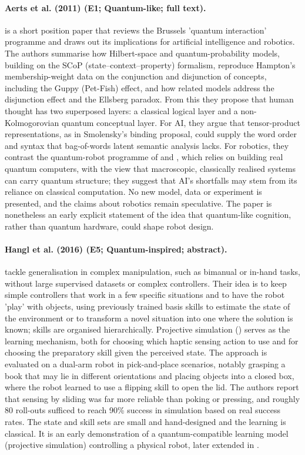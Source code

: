 \documentclass[10pt,a4paper]{article}
\begin{document}
\paragraph{Aerts et al. (2011) (E1; Quantum-like; full text).} \citet{Aerts2011d} is a short position paper that reviews the Brussels 'quantum interaction' programme and draws out its implications for artificial intelligence and robotics. The authors summarise how Hilbert-space and quantum-probability models, building on the SCoP (state--context--property) formalism, reproduce Hampton's membership-weight data on the conjunction and disjunction of concepts, including the Guppy (Pet-Fish) effect, and how related models address the disjunction effect and the Ellsberg paradox. From this they propose that human thought has two superposed layers: a classical logical layer and a non-Kolmogorovian quantum conceptual layer. For AI, they argue that tensor-product representations, as in Smolensky's binding proposal, could supply the word order and syntax that bag-of-words latent semantic analysis lacks. For robotics, they contrast the quantum-robot programme of \citep{Benioff1998} and \citep{Dong2006}, which relies on building real quantum computers, with the view that macroscopic, classically realised systems can carry quantum structure; they suggest that AI's shortfalls may stem from its reliance on classical computation. No new model, data or experiment is presented, and the claims about robotics remain speculative. The paper is nonetheless an early explicit statement of the idea that quantum-like cognition, rather than quantum hardware, could shape robot design.

\paragraph{Hangl et al. (2016) (E5; Quantum-inspired; abstract).} \citet{Hangl2016} tackle generalisation in complex manipulation, such as bimanual or in-hand tasks, without large supervised datasets or complex controllers. Their idea is to keep simple controllers that work in a few specific situations and to have the robot 'play' with objects, using previously trained basis skills to estimate the state of the environment or to transform a novel situation into one where the solution is known; skills are organised hierarchically. Projective simulation (\citep{Briegel2012}) serves as the learning mechanism, both for choosing which haptic sensing action to use and for choosing the preparatory skill given the perceived state. The approach is evaluated on a dual-arm robot in pick-and-place scenarios, notably grasping a book that may lie in different orientations and placing objects into a closed box, where the robot learned to use a flipping skill to open the lid. The authors report that sensing by sliding was far more reliable than poking or pressing, and roughly 80 roll-outs sufficed to reach 90\% success in simulation based on real success rates. The state and skill sets are small and hand-designed and the learning is classical. It is an early demonstration of a quantum-compatible learning model (projective simulation) controlling a physical robot, later extended in \citep{Hangl2020}.
\end{document}
